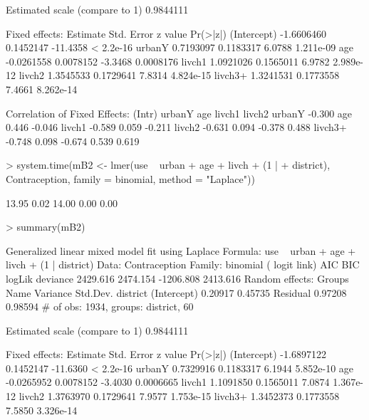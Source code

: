 \documentclass[12pt]{article}
\begin{document}
\begin{Schunk}
\begin{Soutput}
Estimated scale (compare to 1)  0.9844111 

Fixed effects:
              Estimate Std. Error  z value  Pr(>|z|)
(Intercept) -1.6606460  0.1452147 -11.4358 < 2.2e-16
urbanY       0.7193097  0.1183317   6.0788 1.211e-09
age         -0.0261558  0.0078152  -3.3468 0.0008176
livch1       1.0921026  0.1565011   6.9782 2.989e-12
livch2       1.3545533  0.1729641   7.8314 4.824e-15
livch3+      1.3241531  0.1773558   7.4661 8.262e-14

Correlation of Fixed Effects:
        (Intr) urbanY age    livch1 livch2
urbanY  -0.300                            
age      0.446 -0.046                     
livch1  -0.589  0.059 -0.211              
livch2  -0.631  0.094 -0.378  0.488       
livch3+ -0.748  0.098 -0.674  0.539  0.619
\end{Soutput}
\begin{Sinput}
> system.time(mB2 <- lmer(use ~ urban + age + livch + (1 | 
+     district), Contraception, family = binomial, method = "Laplace"))
\end{Sinput}
\begin{Soutput}
[1] 13.95  0.02 14.00  0.00  0.00
\end{Soutput}
\begin{Sinput}
> summary(mB2)
\end{Sinput}
\begin{Soutput}
Generalized linear mixed model fit using Laplace 
Formula: use ~ urban + age + livch + (1 | district) 
   Data: Contraception 
 Family: binomial ( logit link)
      AIC      BIC    logLik deviance
 2429.616 2474.154 -1206.808 2413.616
Random effects:
 Groups   Name        Variance Std.Dev.
 district (Intercept) 0.20917  0.45735 
 Residual             0.97208  0.98594 
# of obs: 1934, groups: district, 60

Estimated scale (compare to 1)  0.9844111 

Fixed effects:
              Estimate Std. Error  z value  Pr(>|z|)
(Intercept) -1.6897122  0.1452147 -11.6360 < 2.2e-16
urbanY       0.7329916  0.1183317   6.1944 5.852e-10
age         -0.0265952  0.0078152  -3.4030 0.0006665
livch1       1.1091850  0.1565011   7.0874 1.367e-12
livch2       1.3763970  0.1729641   7.9577 1.753e-15
livch3+      1.3452373  0.1773558   7.5850 3.326e-14


\end{Soutput}
\end{Schunk}
\end{document}
